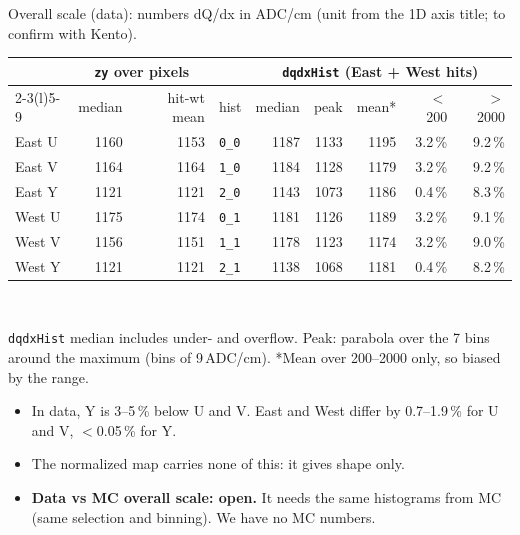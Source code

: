 \documentclass[aspectratio=169,10pt]{beamer}
\newcommand{\open}[1]{\textcolor{open}{\textbf{#1}}}
\newcommand{\code}[1]{\texttt{#1}}
\begin{document}
\begin{frame}{Overall scale (data): numbers}
dQ/dx in ADC/cm (unit from the 1D axis title; to confirm with Kento).\\[2mm]
\centering
\begin{tabular}{@{}lrr@{\hspace{8mm}}lrrrrr@{}}
\toprule
 & \multicolumn{2}{c}{\code{zy} over pixels} & & \multicolumn{5}{c}{\code{dqdxHist} (East + West hits)} \\
\cmidrule(r){2-3}\cmidrule(l){5-9}
 & median & hit-wt mean & hist & median & peak & mean* & $<$200 & $>$2000 \\
\midrule
East U & 1160 & 1153 & \code{0\_0} & 1187 & 1133 & 1195 & 3.2\,\% & 9.2\,\% \\
East V & 1164 & 1164 & \code{1\_0} & 1184 & 1128 & 1179 & 3.2\,\% & 9.2\,\% \\
East Y & 1121 & 1121 & \code{2\_0} & 1143 & 1073 & 1186 & 0.4\,\% & 8.3\,\% \\
West U & 1175 & 1174 & \code{0\_1} & 1181 & 1126 & 1189 & 3.2\,\% & 9.1\,\% \\
West V & 1156 & 1151 & \code{1\_1} & 1178 & 1123 & 1174 & 3.2\,\% & 9.0\,\% \\
West Y & 1121 & 1121 & \code{2\_1} & 1138 & 1068 & 1181 & 0.4\,\% & 8.2\,\% \\
\bottomrule
\end{tabular}\\[1mm]
\raggedright\footnotesize
\code{dqdxHist} median includes under- and overflow. Peak: parabola over the 7 bins around the maximum (bins of 9\,ADC/cm). *Mean over 200--2000 only, so biased by the range.\\[3mm]
\small
\begin{itemize}
\item In data, Y is 3--5\,\% below U and V. East and West differ by 0.7--1.9\,\% for U and V, $<$0.05\,\% for Y.
\item The normalized map carries none of this: it gives shape only.
\item \open{Data vs MC overall scale: open.} It needs the same histograms from MC (same selection and binning). We have no MC numbers.
\end{itemize}
\end{frame}
\end{document}
